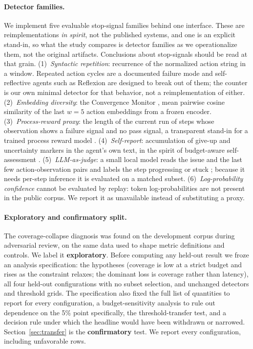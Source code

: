 \documentclass[sigconf,screen]{acmart}
\begin{document}
\paragraph{Detector families.} We implement five evaluable stop-signal families behind one
interface. These are reimplementations \emph{in spirit}, not the published systems, and one
is an explicit stand-in, so what the study compares is detector families as we operationalize them,
not the original artifacts. Conclusions about stop-signals should be read at that grain.
(1)~\emph{Syntactic repetition}: recurrence of the normalized action string in a window. Repeated
action cycles are a documented failure mode \cite{bouzenia2025understanding} and self-reflective
agents such as Reflexion \cite{shinn2023reflexion} are designed to break out of them; the counter
is our own minimal detector for that behavior, not a reimplementation of either.
(2)~\emph{Embedding diversity}:
the Convergence Monitor \cite{zombieagents2026}, mean pairwise cosine similarity of the last $w{=}5$
action embeddings from a frozen encoder. (3)~\emph{Process-reward proxy}: the length of the current
run of steps whose observation shows a failure signal and no pass signal, a transparent stand-in for
a trained process reward model \cite{lightman2023verify}. (4)~\emph{Self-report}: accumulation of
give-up and uncertainty markers in the agent's own text, in the spirit of budget-aware
self-assessment \cite{bagen2026}. (5)~\emph{LLM-as-judge}: a small local model reads the issue and
the last few action-observation pairs and labels the step progressing or stuck \cite{shp2026};
because it needs per-step inference it is evaluated on a matched subset.
(6)~\emph{Log-probability confidence} \cite{agentstop2026} cannot be evaluated by replay: token
log-probabilities are not present in the public corpus. We report it as unavailable instead of
substituting a proxy.

\paragraph{Exploratory and confirmatory split.} The coverage-collapse diagnosis was found on the
development corpus during adversarial review, on the same data used to shape metric definitions and
controls. We label it \textbf{exploratory}. Before computing any held-out result we froze an
analysis specification: the hypotheses (coverage is low at a strict budget and rises as the
constraint relaxes; the dominant loss is coverage rather than latency), all four held-out
configurations with no subset selection, and unchanged detectors and threshold grids. The
specification also fixed the full list of quantities to report for every configuration, a
budget-sensitivity analysis to rule out dependence on the 5\% point specifically, the
threshold-transfer test, and a decision rule under which the headline would have been withdrawn or
narrowed. Section~\ref{sec:transfer} is the
\textbf{confirmatory} test. We report every configuration, including unfavorable rows.
\end{document}
